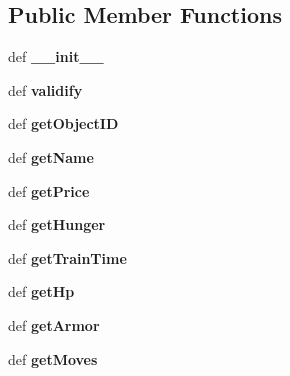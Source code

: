 \subsection*{Public Member Functions}
\begin{CompactItemize}
\item 
\hypertarget{classGameObject_1_1UnitType_3888b50f2a13df0000db36e4781cd3ff}{
def \textbf{\_\-\_\-init\_\-\_\-}}
\label{classGameObject_1_1UnitType_3888b50f2a13df0000db36e4781cd3ff}

\item 
\hypertarget{classGameObject_1_1UnitType_9e5978cc4e5b85aa65d62a172a2b651f}{
def \textbf{validify}}
\label{classGameObject_1_1UnitType_9e5978cc4e5b85aa65d62a172a2b651f}

\item 
\hypertarget{classGameObject_1_1UnitType_6f3133c7cb2dccacc082add2f3e6934a}{
def \textbf{getObjectID}}
\label{classGameObject_1_1UnitType_6f3133c7cb2dccacc082add2f3e6934a}

\item 
\hypertarget{classGameObject_1_1UnitType_d0d9d8e7d891016eac956d6221e0603e}{
def \textbf{getName}}
\label{classGameObject_1_1UnitType_d0d9d8e7d891016eac956d6221e0603e}

\item 
\hypertarget{classGameObject_1_1UnitType_8312ce18858f9e073dbf9f4fa89a2fe2}{
def \textbf{getPrice}}
\label{classGameObject_1_1UnitType_8312ce18858f9e073dbf9f4fa89a2fe2}

\item 
\hypertarget{classGameObject_1_1UnitType_3c2b6d72d746dce2ec0d6eb9a5127f2f}{
def \textbf{getHunger}}
\label{classGameObject_1_1UnitType_3c2b6d72d746dce2ec0d6eb9a5127f2f}

\item 
\hypertarget{classGameObject_1_1UnitType_db21e3e80cd8aa24babcf33ae97a8c6d}{
def \textbf{getTrainTime}}
\label{classGameObject_1_1UnitType_db21e3e80cd8aa24babcf33ae97a8c6d}

\item 
\hypertarget{classGameObject_1_1UnitType_b573147e22ec10c1156fea5aa185d201}{
def \textbf{getHp}}
\label{classGameObject_1_1UnitType_b573147e22ec10c1156fea5aa185d201}

\item 
\hypertarget{classGameObject_1_1UnitType_67c32d0040831757af276b4ceab53f4e}{
def \textbf{getArmor}}
\label{classGameObject_1_1UnitType_67c32d0040831757af276b4ceab53f4e}

\item 
\hypertarget{classGameObject_1_1UnitType_f24e195b3c99a698e3b96abf4ece1897}{
def \textbf{getMoves}}
\label{classGameObject_1_1UnitType_f24e195b3c99a698e3b96abf4ece1897}


\end{CompactItemize}
